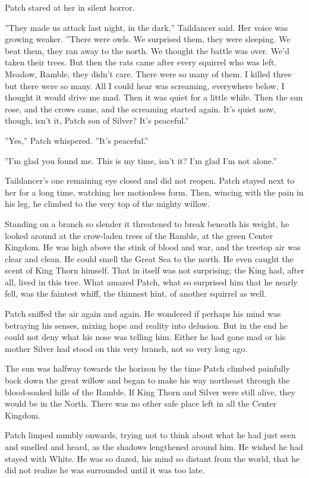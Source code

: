\documentclass[12pt]{book}
\begin{document}
Patch stared at her in silent horror.

''They made us attack last night, in the dark,'' Taildancer said. Her voice was growing weaker. ''There were owls. We surprised them, they were sleeping. We beat them, they ran away to the north. We thought the battle was over. We'd taken their trees. But then the rats came after every squirrel who was left. Meadow, Ramble, they didn't care. There were so many of them. I killed three but there were so many. All I could hear was screaming, everywhere below, I thought it would drive me mad. Then it was quiet for a little while. Then the sun rose, and the crows came, and the screaming started again. It's quiet now, though, isn't it, Patch son of Silver? It's peaceful.''

''Yes,'' Patch whispered. ''It's peaceful.''

''I'm glad you found me. This is my time, isn't it? I'm glad I'm not alone.''

Taildancer's one remaining eye closed and did not reopen. Patch stayed next to her for a long time, watching her motionless form. Then, wincing with the pain in his leg, he climbed to the very top of the mighty willow.

Standing on a branch so slender it threatened to break beneath his weight, he looked around at the crow-laden trees of the Ramble, at the green Center Kingdom. He was high above the stink of blood and war, and the treetop air was clear and clean. He could smell the Great Sea to the north. He even caught the scent of King Thorn himself. That in itself was not surprising; the King had, after all, lived in this tree. What amazed Patch, what so surprised him that he nearly fell, was the faintest whiff, the thinnest hint, of another squirrel as well.

Patch sniffed the air again and again. He wondered if perhaps his mind was betraying his senses, mixing hope and reality into delusion. But in the end he could not deny what his nose was telling him. Either he had gone mad %
or his mother Silver had stood on this very branch, not so very long ago.

The sun was halfway towards the horizon by the time Patch climbed painfully back down the great willow and began to make his way northeast through the blood-soaked hills of the Ramble. If King Thorn and Silver were still alive, they would be in the North. There was no other safe place left in all the Center Kingdom.

Patch limped numbly onwards, trying not to think about what he had just seen and smelled and heard, as the shadows lengthened around him. He wished he had stayed with White. He was so dazed, his mind so distant from the world, that he did not realize he was surrounded until it was too late.
\end{document}
